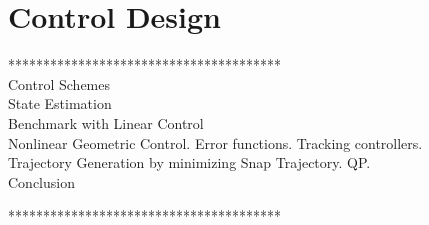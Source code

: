 \chapter{Control Design}
***************************************\\
Control Schemes\\
State Estimation\\
Benchmark with Linear Control\\
Nonlinear Geometric Control. Error functions. Tracking controllers.\\
Trajectory Generation by minimizing Snap Trajectory. QP.\\
Conclusion




***************************************\\